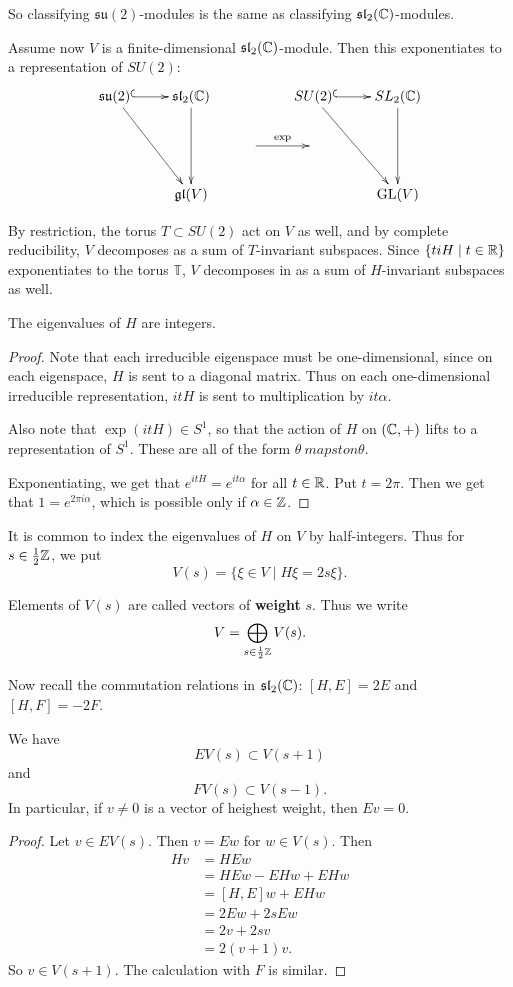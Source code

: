 \documentclass[11pt, english]{article}
\begin{document}
So classifying $\mathfrak{su}(2)$-modules is the same as classifying $\mathfrak{sl}_2(\mathbb{C})$-modules.

Assume now $V$ is a finite-dimensional $\mathfrak{sl}_2(\mathbb{C})$-module. Then this exponentiates to a representation of $SU(2)$:
$$
\xymatrix{
\mathfrak{su}(2) \ar@{^{(}->}[r] \ar[ddr] &  \mathfrak{sl}_2(\C) \ar[dd] & & SU(2) \ar[ddr]  \ar@{^(->}[r] & SL_2(\C) \ar[dd] \\
& & \ar[r]^{\exp}   & \\
&  \mathfrak{gl}(V) && & \GL(V)
}
$$

By restriction, the torus $T \subset SU(2)$ act on $V$ as well, and by complete reducibility, $V$ decomposes as a sum of $T$-invariant subspaces. Since $\{ ti H \mid t \in \mathbb{R} \}$ exponentiates to the torus $\mathbb T$, $V$ decomposes in as a sum of $H$-invariant subspaces as well.

\begin{lemma}
  The eigenvalues of $H$ are integers.
\end{lemma}
\begin{proof}
Note that each irreducible eigenspace must be one-dimensional, since on each eigenspace, $H$ is sent to a diagonal matrix. Thus on each one-dimensional irreducible representation, $itH$ is sent to multiplication by $it\alpha$.

Also note that $\exp(itH) \in S^1$, so that the action of $H$ on $(\mathbb{C},+)$ lifts to a representation of $S^1$. These are all of the form $\theta \ mapsto n \theta$.

Exponentiating, we get that $e^{itH}=e^{it\alpha}$ for all $t \in \mathbb{R}$. Put $t=2\pi$. Then we get that $1=e^{2\pi i \alpha}$, which is possible only if $\alpha \in \mathbb{Z}$.
\end{proof}

It is common to index the eigenvalues of $H$ on $V$ by half-integers. Thus for $s \in \frac 12 \mathbb{Z}$, we put
$$
V(s) = \{ \xi \in V \mid H \xi = 2s \xi \}.
$$

Elements of $V(s)$ are called vectors of \textbf{weight} $s$. Thus we write
$$
V = \bigoplus_{s \in \frac 12 \mathbb{Z}} V(s).
$$

Now recall the commutation relations in $\mathfrak{sl}_2(\mathbb{C})$: $[H,E]=2E$ and $[H,F]=-2F$.

\begin{lemma}
  We have 
$$
EV(s) \subset V(s+1)
$$
and 
$$
FV(s) \subset V(s-1).
$$
In particular, if $v \neq 0$ is a vector of heighest weight, then $Ev = 0$.
\end{lemma}
\begin{proof}
Let $v \in EV(s)$. Then $v=Ew$ for $w \in V(s)$. Then
\begin{align*}
  Hv &= HEw \\
&= HEw - EHw + EHw \\
&= [H,E]w + EHw \\
&= 2Ew + 2sEw\\
&=2v+2sv \\
&=2(v+1)v.
\end{align*}
So $v \in V(s+1)$. The calculation with $F$ is similar.
\end{proof}
\end{document}
